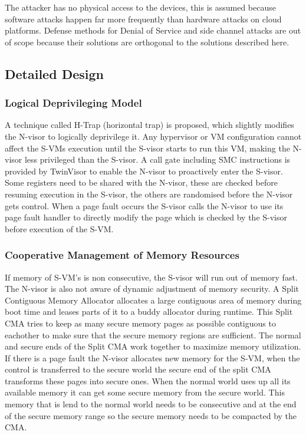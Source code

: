 \documentclass{article}
\begin{document}
The attacker has no physical access to the devices, this is assumed because software attacks happen far more frequently than hardware attacks on cloud platforms. Defense methods for Denial of Service and side channel attacks are out of scope because their solutions are orthogonal to the solutions described here. 

\subsection{Detailed Design}

\subsubsection{Logical Deprivileging Model}

A technique called H-Trap (horizontal trap) is proposed, which slightly modifies the N-visor to logically deprivilege it. Any hypervisor or VM configuration cannot affect the S-VMs execution until the S-visor starts to run this VM, making the N-visor less privileged than the S-visor. A call gate including SMC instructions is provided by TwinVisor to enable the N-visor to proactively enter the S-visor. Some registers need to be shared with the N-visor, these are checked before resuming execution in the S-visor, the others are randomised before the N-visor gets control. When a page fault occurs the S-visor calls the N-visor to use its page fault handler to directly modify the page which is checked by the S-visor before execution of the S-VM.

\subsubsection{Cooperative Management of Memory Resources}

If memory of S-VM's is non consecutive, the S-visor will run out of memory fast. The N-visor is also not aware of dynamic adjustment of memory security. A Split Contiguous Memory Allocator allocates a large contiguous area of memory during boot time and leases parts of it to a buddy allocator during runtime. This Split CMA tries to keep as many secure memory pages as possible contiguous to eachother to make sure that the secure memory regions are sufficient. The normal and secure ends of the Split CMA work together to maximize memory utilization. If there is a page fault the N-visor allocates new memory for the S-VM, when the control is transferred to the secure world the secure end of the split CMA transforms these pages into secure ones. When the normal world uses up all its available memory it can get some secure memory from the secure world. This memory that is lend to the normal world needs to be consecutive and at the end of the secure memory range so the secure memory needs to be compacted by the CMA.
\end{document}
